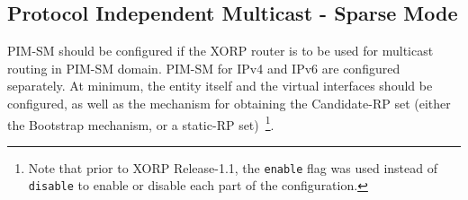 \documentclass[11pt]{article}
\begin{document}
\vspace{0.1in}
\noindent{}
\vspace{0.1in}

\subsection{Protocol Independent Multicast - Sparse Mode}
\label{sec:protocols:pim}

PIM-SM should be configured if the XORP router is to be used for
multicast routing in PIM-SM domain. PIM-SM for IPv4 and IPv6 are
configured separately. At minimum, the entity itself and the
virtual interfaces should be configured, as well as the mechanism for obtaining
the Candidate-RP set (either the Bootstrap mechanism, or a static-RP
set)~\footnote{Note that prior to XORP Release-1.1, the {\tt enable} flag
was used instead of {\tt disable} to enable or disable each part of the
configuration.}.
\end{document}
